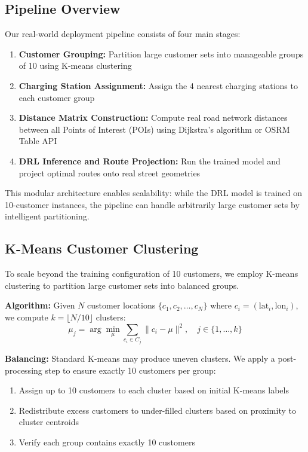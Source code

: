 \documentclass[11pt,a4paper]{article}
\begin{document}
\subsection{Pipeline Overview}

Our real-world deployment pipeline consists of four main stages:
\begin{enumerate}
    \item \textbf{Customer Grouping:} Partition large customer sets into manageable groups of 10 using K-means clustering
    \item \textbf{Charging Station Assignment:} Assign the 4 nearest charging stations to each customer group
    \item \textbf{Distance Matrix Construction:} Compute real road network distances between all Points of Interest (POIs) using Dijkstra's algorithm or OSRM Table API
    \item \textbf{DRL Inference and Route Projection:} Run the trained model and project optimal routes onto real street geometries
\end{enumerate}

This modular architecture enables scalability: while the DRL model is trained on 10-customer instances, the pipeline can handle arbitrarily large customer sets by intelligent partitioning.

\subsection{K-Means Customer Clustering}

To scale beyond the training configuration of 10 customers, we employ K-means clustering to partition large customer sets into balanced groups.

\textbf{Algorithm:} Given $N$ customer locations $\{c_1, c_2, \ldots, c_N\}$ where $c_i = (\text{lat}_i, \text{lon}_i)$, we compute $k = \lfloor N/10 \rfloor$ clusters:
\begin{equation}
\mu_j = \arg\min_{\mu} \sum_{c_i \in C_j} \|c_i - \mu\|^2, \quad j \in \{1, \ldots, k\}
\end{equation}

\textbf{Balancing:} Standard K-means may produce uneven clusters. We apply a post-processing step to ensure exactly 10 customers per group:
\begin{enumerate}
    \item Assign up to 10 customers to each cluster based on initial K-means labels
    \item Redistribute excess customers to under-filled clusters based on proximity to cluster centroids
    \item Verify each group contains exactly 10 customers
\end{enumerate}
\end{document}
